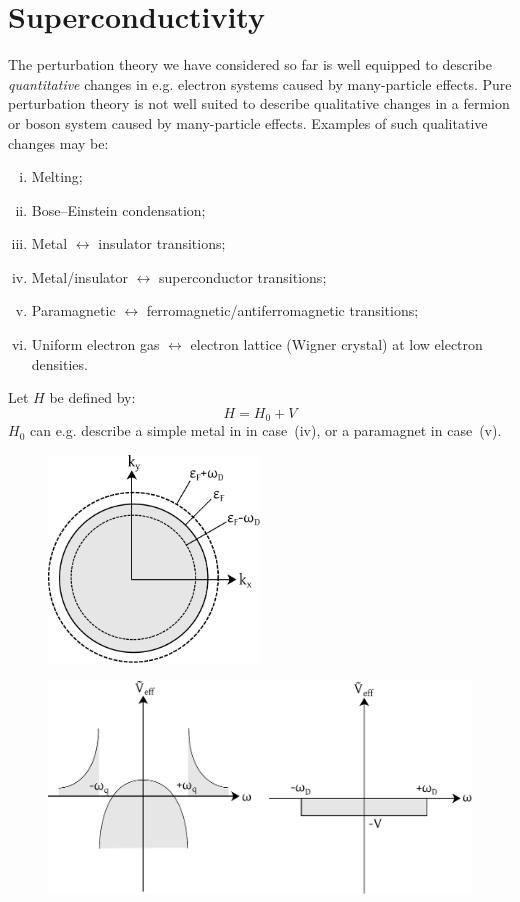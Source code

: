 \section{Superconductivity}
The perturbation theory we have considered so far is well equipped to describe \emph{quantitative} changes in e.g. electron systems caused by many-particle effects.
Pure perturbation theory is not well suited to describe qualitative changes in a fermion or boson system caused by many-particle effects.
Examples of such qualitative changes may be:
\begin{enumerate}[(i)]
  \item Melting;
  \item Bose--Einstein condensation;
  \item Metal $\leftrightarrow$ insulator transitions;
  \item Metal/insulator  $\leftrightarrow$ superconductor transitions;
  \item Paramagnetic $\leftrightarrow$ ferromagnetic/antiferromagnetic transitions;
  \item Uniform electron gas $\leftrightarrow$ electron lattice (Wigner crystal) at low electron densities.
\end{enumerate}
Let $H$ be defined by:
\[
  H = H_0 + V
\]
$H_0$ can e.g. describe a simple metal in in case~(iv), or a paramagnet in case~(v).



\clearpage


\begin{figure}[H]
  \centering
  \includegraphics[width=0.5\textwidth]{img/pp181-200_fermisurface.pdf}
\end{figure}


\begin{figure}[H]
  \centering
  \includegraphics[width=\textwidth]{img/pp181-200_veffapprox.pdf}
\end{figure}



